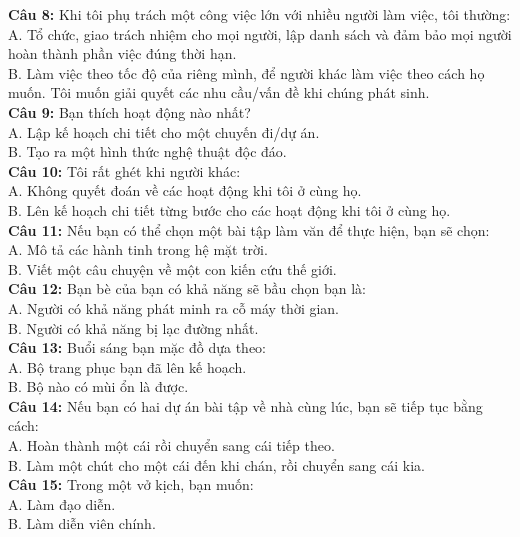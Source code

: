 \begin{multicols}{2}
\textbf{Câu 8:} Khi tôi phụ trách một công việc lớn với nhiều người làm việc, tôi thường: \\
A. Tổ chức, giao trách nhiệm cho mọi người, lập danh sách và đảm bảo mọi người hoàn thành phần việc đúng thời hạn. \\
B. Làm việc theo tốc độ của riêng mình, để người khác làm việc theo cách họ muốn. Tôi muốn giải quyết các nhu cầu/vấn đề khi chúng phát sinh. \\

\textbf{Câu 9:} Bạn thích hoạt động nào nhất? \\
A. Lập kế hoạch chi tiết cho một chuyến đi/dự án. \\
B. Tạo ra một hình thức nghệ thuật độc đáo. \\

\textbf{Câu 10:} Tôi rất ghét khi người khác: \\
A. Không quyết đoán về các hoạt động khi tôi ở cùng họ. \\
B. Lên kế hoạch chi tiết từng bước cho các hoạt động khi tôi ở cùng họ. \\

\textbf{Câu 11:} Nếu bạn có thể chọn một bài tập làm văn để thực hiện, bạn sẽ chọn: \\
A. Mô tả các hành tinh trong hệ mặt trời. \\
B. Viết một câu chuyện về một con kiến cứu thế giới. \\

\textbf{Câu 12:} Bạn bè của bạn có khả năng sẽ bầu chọn bạn là: \\
A. Người có khả năng phát minh ra cỗ máy thời gian. \\
B. Người có khả năng bị lạc đường nhất. \\

\textbf{Câu 13:} Buổi sáng bạn mặc đồ dựa theo: \\
A. Bộ trang phục bạn đã lên kế hoạch. \\
B. Bộ nào có mùi ổn là được. \\

\textbf{Câu 14:} Nếu bạn có hai dự án bài tập về nhà cùng lúc, bạn sẽ tiếp tục bằng cách: \\
A. Hoàn thành một cái rồi chuyển sang cái tiếp theo. \\
B. Làm một chút cho một cái đến khi chán, rồi chuyển sang cái kia. \\

\textbf{Câu 15:} Trong một vở kịch, bạn muốn: \\
A. Làm đạo diễn. \\
B. Làm diễn viên chính. \\


\end{multicols}
